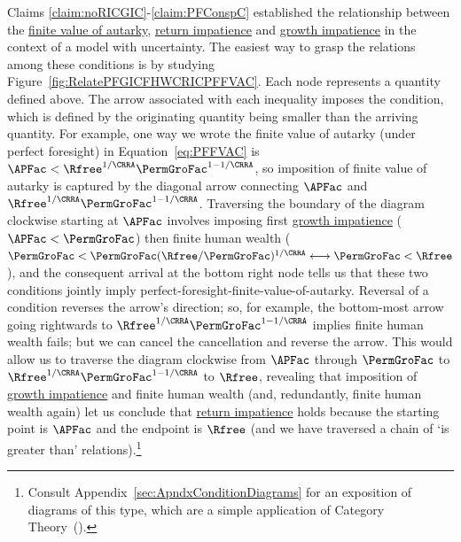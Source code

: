 \documentclass[\econtexRoot/BufferStockTheory]{subfiles}
\begin{document}
Claims \ref{claim:noRICGIC}-\ref{claim:PFConspC} established the relationship between the \hyperlink{PFFVAC}{finite value of autarky}, \hyperlink{RIC}{return impatience} and \hyperlink{GICRaw}{growth impatience} in the context of a model with uncertainty.
The easiest way to grasp the relations among these conditions is by studying Figure~\ref{fig:RelatePFGICFHWCRICPFFVAC}.
Each node represents a quantity defined above.
The arrow associated with each inequality imposes the condition, which is defined by the originating quantity being smaller than the arriving quantity.
For example, one way we wrote the \hypertarget{PFFVAC}{finite value of autarky} (under perfect foresight) in Equation~\eqref{eq:PFFVAC} is $\APFac < \Rfree^{1/\CRRA} \PermGroFac^{1-1/\CRRA}$, so imposition of \hypertarget{PFFVAC}{finite value of autarky} is captured by the diagonal arrow connecting $\APFac$ and $\Rfree^{1/\CRRA}\PermGroFac^{1-1/\CRRA}$.
Traversing the boundary of the diagram clockwise starting at $\APFac$ involves imposing first \hyperlink{GICRaw}{growth impatience} ($\APFac < \PermGroFac$) then \hypertarget{FHWC}{finite human wealth} ($\PermGroFac < \PermGroFac(\Rfree/\PermGroFac)^{1/\CRRA} \longleftrightarrow \PermGroFac < \Rfree $), and the consequent arrival at the bottom right node tells us that these two conditions jointly imply \hypertarget{PFFVAC}{perfect-foresight-finite-value-of-autarky}.
Reversal of a condition reverses the arrow's direction; so, for example, the bottom-most arrow going rightwards to $\Rfree^{1/\CRRA}\PermGroFac^{1-1/\CRRA}$ implies  \hypertarget{FHWC}{finite human wealth} fails; but we can cancel the cancellation and reverse the arrow.
This would allow us to traverse the diagram clockwise from $\APFac$  through $\PermGroFac$ to $\Rfree^{1/\CRRA}\PermGroFac^{1-1/\CRRA}$ to $\Rfree$, revealing that imposition of \hyperlink{GICRaw}{growth impatience} and \hypertarget{FHWC}{finite human wealth} (and, redundantly, \hypertarget{FHWC}{finite human wealth} again) let us conclude that \hyperlink{RIC}{return impatience} holds because the starting point is $\APFac$ and the endpoint is $\Rfree$ (and we have traversed a chain of `is greater than' relations).\footnote{Consult Appendix~\ref{sec:ApndxConditionDiagrams} for an exposition of diagrams of this type, which are a simple application of Category Theory~(\cite{riehl2017category}).}

\renewcommand{\figName}{RelatePFGICFHWCRICPFFVAC} 
\hypertarget{\figName}{}
\end{document}
